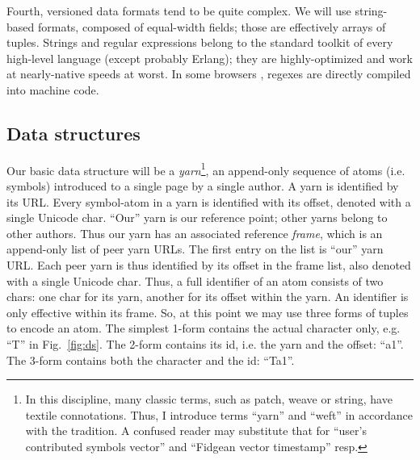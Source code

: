 \documentclass{sig-alternate}
\begin{document}
Fourth, versioned data formats tend to be quite complex.
We will use string-based formats, composed of equal-width fields; those are effectively arrays of tuples.
Strings and regular expressions belong to the standard toolkit of every high-level language (except probably Erlang); they are highly-optimized and work at nearly-native speeds at worst.
In some browsers \cite{irregex,wrec}, regexes are directly compiled into machine code.

\subsection{Data structures}	\label{sec:data}

\newcommand{\aum}{{\fontspec{Devanagari MT}\selectfont ॐ}}
\newcommand{\eoa}{{\fontspec{Geeza Pro}\selectfont ۝}}
\newcommand{\bsp}{{\fontspec{Apple Symbols} ⌫}}
\newcommand{\cnc}{{\fontspec{Apple Symbols} ⌦}}
\newcommand{\zero}{{\fontspec{Apple Symbols} ⌀}}

Our basic data structure will be a \emph{yarn}\footnote{In this discipline, many classic terms, such as patch, weave or string, have textile connotations. Thus, I introduce terms ``yarn'' and ``weft'' in accordance with the tradition. A confused reader may substitute that for ``user's contributed symbols vector'' and ``Fidgean vector timestamp'' resp.}, an append-only sequence of atoms (i.e. symbols) introduced to a single page by a single author.
A yarn is identified by its URL.
Every symbol-atom in a yarn is identified with its offset, denoted with a single Unicode char.
``Our'' yarn is our reference point; other yarns belong to other authors.
Thus our yarn has an associated reference \emph{frame}, which is an append-only list of peer yarn URLs. The first entry on the list is ``our'' yarn URL.
Each peer yarn is thus identified by its offset in the frame list, also denoted with a single Unicode char.
Thus, a full identifier of an atom consists of two chars: one char for its yarn, another for its offset within the yarn.
An identifier is only effective within its frame.
So, at this point we may use three forms of tuples to encode an atom. The simplest 1-form contains the actual character only, e.g. ``T'' in Fig.~\ref{fig:ds}. The 2-form contains its id, i.e. the yarn and the offset: ``a1''. The 3-form contains both the character and the id: ``Ta1''.
\end{document}
